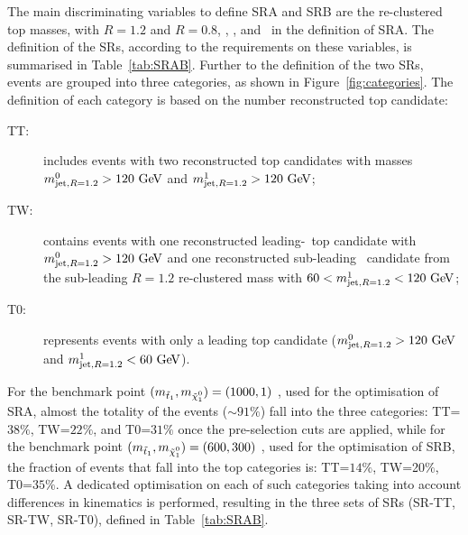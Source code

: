 				The main discriminating variables to define SRA and SRB are the re-clustered top masses, with $R = 1.2$ and $R = 0.8$, \mtbmin, \drbb, and \met\ in the definition of SRA. The definition of the \acp{SR}, according to the requirements on these variables, is summarised in Table~\ref{tab:SRAB}. Further to the definition of the two \acp{SR}, events are grouped into three categories, as shown in Figure~\ref{fig:categories}. The definition of each category is based on the number reconstructed top candidate: 
				
				\begin{description}
					\item[TT:] includes events with two reconstructed top candidates with masses $\mantikttwelvezero>120\gev$ and $\mantikttwelveone>120\gev$;
					\item[TW:] contains events with one reconstructed leading-\pt\ top candidate with $\mantikttwelvezero>120\gev$ and one reconstructed sub-leading \Wboson\ candidate from the sub-leading $R = 1.2$ re-clustered mass with $60<\mantikttwelveone<120\gev$;
					\item[T0:] represents events with only a leading top candidate ($\mantikttwelvezero>120\gev$ and $\mantikttwelveone<60\gev$).
				\end{description}

				\noindent For the benchmark point $(\mstopone, \mninoone) = (1000,1)$ \GeV, used for the optimisation of SRA, almost the totality of the events ($\sim 91\%$) fall into the three categories: TT=$38\%$, TW=$22\%$, and T0=$31\%$ once the pre-selection cuts are applied, while for the benchmark point $(\mstopone, \mninoone) = (600,300)$ \GeV, used for the optimisation of SRB, the fraction of events that fall into the top categories is: TT=$14\%$, TW=20$\%$, T0=$35\%$. A dedicated optimisation on each of such categories taking into account differences in kinematics is performed, resulting in the three sets of \acp{SR} (SR-TT, SR-TW, SR-T0), defined in Table~\ref{tab:SRAB}. %
				
